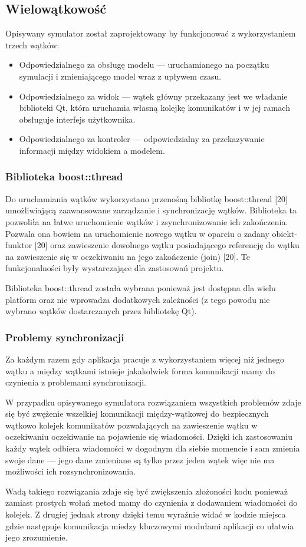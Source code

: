 {\subsection{Wielowątkowość}
\par{
Opisywany symulator został zaprojektowany by funkcjonować z wykorzystaniem trzech wątków:
\begin{itemize}
\item Odpowiedzialnego za obsługę modelu --- uruchamianego na początku symulacji i zmieniającego model wraz z upływem czasu.
\item Odpowiedzialnego za widok --- wątek główny przekazany jest we władanie biblioteki Qt, która uruchamia własną kolejkę komunikatów i w jej ramach obsługuje interfejs użytkownika.
\item Odpowiedzialnego za kontroler --- odpowiedzialny za przekazywanie informacji między widokiem a modelem.
\end{itemize} 
}
\subsubsection{Biblioteka boost::thread}
\par{
Do uruchamiania wątków wykorzystano przenośną bibliotkę boost::thread [20] umożliwiającą zaawansowane zarządzanie i synchronizację wątków. Biblioteka ta pozwoliła na łatwe uruchomienie wątków i zsynchronizowanie ich zakończenia. Pozwala ona bowiem na uruchomienie nowego wątku w oparciu o zadany obiekt-funktor [20] oraz zawieszenie dowolnego wątku posiadającego referencję do wątku na zawieszenie się w oczekiwaniu na jego zakończenie (join) [20]. Te funkcjonalności były wystarczające dla zastosowań projektu.
}
\par{
Biblioteka boost::thread została wybrana ponieważ jest dostępna dla wielu platform oraz nie wprowadza dodatkowych zależności (z tego powodu nie wybrano wątków dostarczanych przez bibliotekę Qt).
}

\subsubsection{Problemy synchronizacji}
\par{
Za każdym razem gdy aplikacja pracuje z wykorzystaniem więcej niż jednego wątku a między wątkami istnieje jakakolwiek forma komunikacji mamy do czynienia z problemami synchronizacji.
}
\par{
W przypadku opisywanego symulatora rozwiązaniem wszystkich problemów zdaje się być zwężenie wszelkiej komunikacji między-wątkowej do bezpiecznych wątkowo  kolejek komunikatów pozwalających na zawieszenie wątku w oczekiwaniu oczekiwanie na pojawienie się wiadomości. Dzięki ich zastosowaniu każdy wątek odbiera wiadomości w dogodnym dla siebie momencie i sam zmienia swoje dane --- jego dane zmieniane są tylko przez jeden wątek więc nie ma możliwości ich rozsynchronizowania.
\par{
Wadą takiego rozwiązania zdaje się być zwiększenia złożoności kodu ponieważ zamiast prostych wołań metod mamy do czynienia z dodawaniem wiadomości do kolejek. Z drugiej jednak strony dzięki temu wyraźnie widać w kodzie miejsca gdzie następuje komunikacja miedzy kluczowymi modułami aplikacji co ułatwia jego zrozumienie.
}


}}
